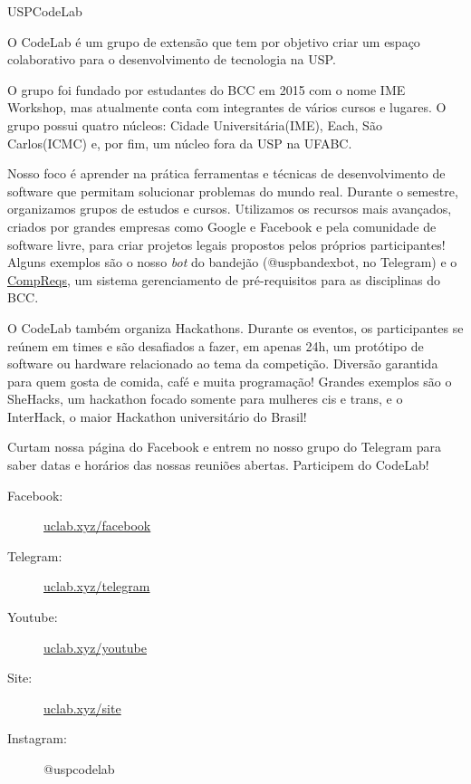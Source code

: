 \begin{subsecao}{USPCodeLab}


O CodeLab é um grupo de extensão que tem por objetivo criar um espaço
colaborativo para o desenvolvimento de tecnologia na USP.

O grupo foi fundado por estudantes do BCC em 2015 com o nome IME Workshop, mas atualmente
conta com integrantes de vários cursos e lugares. O grupo possui quatro núcleos: Cidade Universitária(IME),
Each, São Carlos(ICMC) e, por fim, um núcleo fora da USP na UFABC.

Nosso foco é aprender
na prática ferramentas e técnicas de desenvolvimento de software que permitam
solucionar problemas do mundo real. Durante o semestre, organizamos grupos de estudos e cursos.
Utilizamos os recursos mais avançados, criados por grandes empresas como Google
e Facebook e pela comunidade de software livre, para criar projetos legais
propostos pelos próprios participantes! Alguns exemplos são o nosso \textit{bot}
do bandejão (@uspbandexbot, no Telegram) e o  \href{http://compreqs.surge.sh/}{CompReqs}, um sistema gerenciamento
de pré-requisitos para as disciplinas do BCC.

O CodeLab também organiza Hackathons. Durante os eventos, os participantes se reúnem em times e são
desafiados a fazer, em apenas 24h, um protótipo de software ou hardware
relacionado ao tema da competição. Diversão garantida para quem gosta de comida,
café e muita programação! Grandes exemplos são o SheHacks, um hackathon focado somente para mulheres
cis e trans, e o InterHack, o maior Hackathon universitário do Brasil!

Curtam nossa página do Facebook e entrem no nosso grupo do Telegram para saber
datas e horários das nossas reuniões abertas. Participem do CodeLab!

\begin{description}
\item[Facebook:] \url{uclab.xyz/facebook}
\item[Telegram:] \url{uclab.xyz/telegram}
\item[Youtube:] \url{uclab.xyz/youtube}
\item[Site:] \url{uclab.xyz/site}
\item[Instagram:] @uspcodelab
\end{description}

\end{subsecao}
